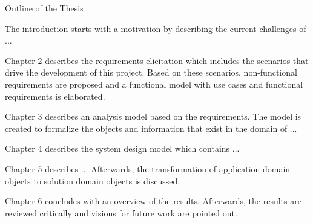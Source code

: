 \clearemptydoublepage

{}

\begin{center}
	\huge{Outline of the Thesis}
\end{center}


  \vspace{1mm}

\noindent  The introduction starts with a motivation by describing the current challenges of ... \\

  \vspace{1mm}

\noindent  Chapter 2 describes the requirements elicitation which includes the scenarios that drive the development of this project. Based on these scenarios, non-functional requirements are proposed and a functional model with use cases and functional requirements is elaborated. \\

  \vspace{1mm}

\noindent  Chapter 3 describes an analysis model based on the requirements. The model is created to formalize the objects and information that exist in the domain of ... \\

  \vspace{1mm}

\noindent  Chapter 4 describes the system design model which contains ... \\

  \vspace{1mm}

\noindent Chapter 5 describes ...
Afterwards, the transformation of application domain objects to solution domain objects is discussed. \\

  \vspace{1mm}

\noindent  Chapter 6 concludes with an overview of the results. Afterwards, the results are reviewed critically and visions for future work are pointed out. \\

